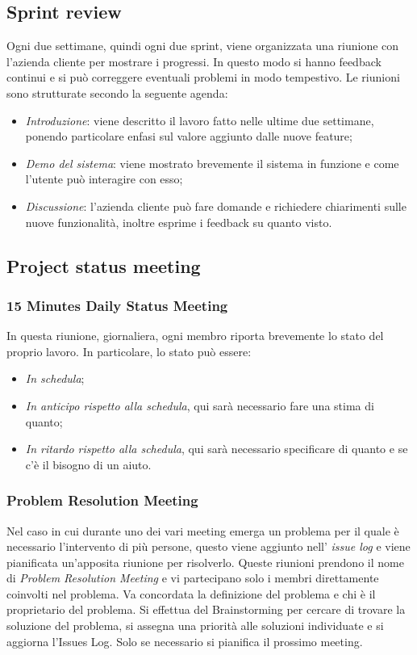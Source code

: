 \documentclass{article}
\begin{document}
  \subsection{Sprint review}
  Ogni due settimane, quindi ogni due sprint, viene organizzata una riunione con l'azienda cliente per mostrare i progressi.
  In questo modo si hanno feedback continui e si può correggere eventuali problemi in modo tempestivo. Le riunioni sono strutturate 
  secondo la seguente agenda:
  \begin{itemize}
    \item \emph{Introduzione}: viene descritto il lavoro fatto nelle ultime due settimane, ponendo particolare enfasi sul valore
      aggiunto dalle nuove feature;
    \item \emph{Demo del sistema}: viene mostrato brevemente il sistema in funzione e come l'utente può interagire con esso;
    \item \emph{Discussione}: l'azienda cliente può fare domande e richiedere chiarimenti sulle nuove funzionalità, inoltre esprime 
      i feedback su quanto visto.
  \end{itemize} 

  \subsection{Project status meeting}

  \subsubsection*{15 Minutes Daily Status Meeting}
  In questa riunione, giornaliera, ogni membro riporta brevemente lo stato del proprio lavoro.
  In particolare, lo stato può essere:
  \begin{itemize}
    \item \emph{In schedula};
    \item \emph{In anticipo rispetto alla schedula}, qui sarà necessario fare una stima di quanto;
    \item \emph{In ritardo rispetto alla schedula}, qui sarà necessario specificare
      di quanto e se c'è il bisogno di un aiuto.
  \end{itemize}

  \subsubsection*{Problem Resolution Meeting}
  Nel caso in cui durante uno dei vari meeting emerga un problema per il quale è necessario l'intervento di più persone, questo viene aggiunto
    nell' \emph{issue log} e viene pianificata un'apposita riunione per risolverlo. Queste riunioni prendono il nome 
    di \emph{Problem Resolution Meeting} e vi partecipano solo i membri direttamente coinvolti nel problema. Va concordata la definizione 
    del problema e chi è il proprietario del problema. Si effettua del Brainstorming per cercare di trovare la soluzione del problema, si assegna
    una priorità alle soluzioni individuate e si aggiorna l’Issues Log. Solo se necessario si pianifica il prossimo
    meeting.
  
\end{document}
